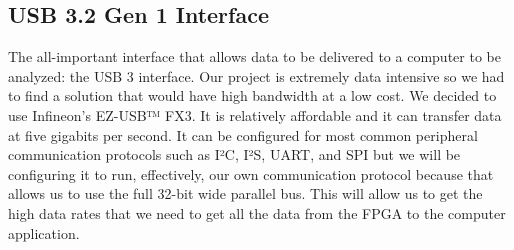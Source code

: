 \subsection{USB 3.2 Gen 1 Interface}
	The all-important interface that allows data to be delivered to a computer to be analyzed: the USB 3 interface. Our project is extremely data intensive so we had to find a solution that would have high bandwidth at a low cost. We decided to use Infineon's EZ-USB™ FX3. It is relatively affordable and it can transfer data at five gigabits per second. It can be configured for most common peripheral communication protocols such as I²C, I²S, UART, and SPI but we will be configuring it to run, effectively, our own communication protocol because that allows us to use the full 32-bit wide parallel bus. This will allow us to get the high data rates that we need to get all the data from the FPGA to the computer application.